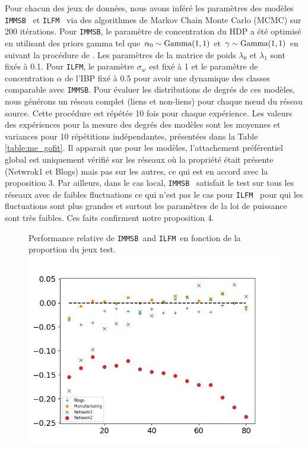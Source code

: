 \documentclass[french]{hermes-journal}
\renewcommand{\text}{\textnormal}
\newcommand{\ilfm}{\texttt{ILFM}}
\newcommand{\immsb}{\texttt{IMMSB}}
\begin{document}
Pour chacun des jeux de données, nous avons inféré les paramètres des modèles \immsb~ et \ilfm~  via des algorithmes de Markov Chain Monte Carlo (MCMC) sur 200 itérations. Pour \immsb, le paramètre de concentration du HDP a été optimisé en utilisant des priors gamma tel que $\alpha_0 \sim \text{Gamma}(1,1)$ et $\gamma \sim \text{Gamma}(1,1)$ en suivant la procédure de \cite{HDP}. Les paramètres de la matrice de poids $\lambda_0$ et $\lambda_1$ sont fixés à 0.1. Pour \ilfm, le paramètre $\sigma_w$ est fixé à 1 et le paramètre de concentration $\alpha$ de l'IBP fixé à 0.5 pour avoir une dynamique des classes comparable avec \immsb. Pour évaluer les distributions de degrés de ces modèles, nous générons un réseau complet (liens et non-liens) pour chaque n\oe{}ud du réseau source. Cette procédure est répétée 10 fois pour chaque expérience. Les valeurs des expériences pour la mesure des degrés des modèles  sont les moyennes et variances pour 10 répétitions indépendantes, présentées dans la Table \ref{table:me_gofit}. 
Il apparait que pour les modèles, l'attachement préférentiel global est uniquement vérifié sur les réseaux où la propriété était présente (Netwrok1 et Blogs) mais pas sur les autres, ce qui est en accord avec la proposition 3. Par ailleurs, dans le cas local, \immsb~ satisfait le test sur tous les réseaux avec de faibles fluctuations ce qui n'est pas le cas pour \ilfm~ pour qui les fluctuations sont plus grandes et surtout les paramètres de la loi de puissance sont très faibles. Ces faits confirment notre proposition 4.





\begin{figure}[h] {Performance relative de \immsb\ and \ilfm\ en fonction de la proportion du jeux test.} 
        \includegraphics[scale=0.45]{img/corpus/testset_max_20.png}
\label{fig:auc}
\end{figure}
\end{document}
